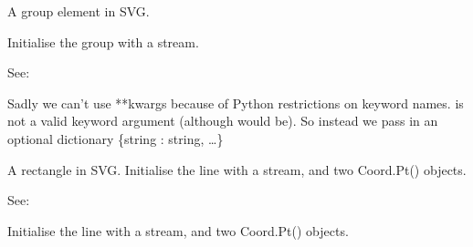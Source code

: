\documentclass[letterpaper,10pt,english]{sphinxmanual}
\begin{document}

\begin{fulllineitems}
\label{\detokenize{ref/util/plot/SVGWriter:TotalDepth.util.plot.SVGWriter.SVGGroup}}
A group element in SVG.

\begin{fulllineitems}
\label{\detokenize{ref/util/plot/SVGWriter:TotalDepth.util.plot.SVGWriter.SVGGroup.__init__}}
Initialise the group with a stream.

See: 

Sadly we can’t use **kwargs because of Python restrictions on keyword
names.  is not a valid keyword
argument (although  would be). So instead we pass in an
optional dictionary \{string : string, …\}

\end{fulllineitems}


\end{fulllineitems}


\begin{fulllineitems}
\label{\detokenize{ref/util/plot/SVGWriter:TotalDepth.util.plot.SVGWriter.SVGLine}}
A rectangle in SVG. Initialise the line with a stream, and two Coord.Pt() objects.

See: 

\begin{fulllineitems}
\label{\detokenize{ref/util/plot/SVGWriter:TotalDepth.util.plot.SVGWriter.SVGLine.__init__}}
Initialise the line with a stream, and two Coord.Pt() objects.

\end{fulllineitems}


\end{fulllineitems}
\end{document}
